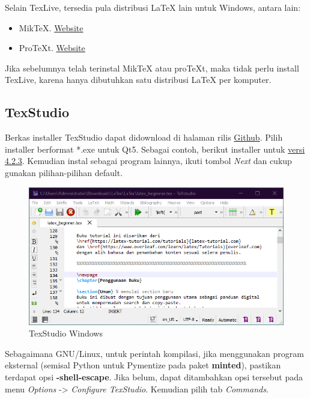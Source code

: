 \documentclass{book} %
\begin{document}
	Selain TexLive, tersedia pula distribusi \LaTeX{} lain untuk Windows, antara lain:
	\begin{itemize}
		\item MikTeX. \href{https://miktex.org/}{Website}
		\item ProTeXt. \href{https://www.tug.org/protext/}{Website}
	\end{itemize}

	Jika sebelumnya telah terinstal MikTeX atau proTeXt, maka tidak perlu install TexLive, karena hanya dibutuhkan satu distribusi \LaTeX{} per komputer.

	\subsection{TexStudio}

	Berkas installer TexStudio dapat didownload di halaman rilis \href{https://github.com/texstudio-org/texstudio/releases/}{Github}.
	Pilih installer berformat *.exe untuk Qt5.
	Sebagai contoh, berikut installer untuk \href{https://github.com/texstudio-org/texstudio/releases/download/4.2.3/texstudio-4.2.3-win-qt5.exe}{versi 4.2.3}.
	Kemudian instal sebagai program lainnya, ikuti tombol \textit{Next} dan cukup gunakan pilihan-pilihan default.

	\begin{figure}[!ht]
		\centering
		\includegraphics[width=400pt]{images/texstudiowin0}
		\caption{TexStudio Windows}
	\end{figure}

	Sebagaimana GNU/Linux, untuk perintah kompilasi, jika menggunakan program eksternal (semisal Python untuk Pymentize pada paket \textbf{minted}),
	pastikan terdapat opsi \textbf{-shell-escape}.
	Jika belum, dapat ditambahkan opsi tersebut pada menu \textit{Options} -> \textit{Configure TexStudio}.
	Kemudian pilih tab \textit{Commands}.
\end{document}
